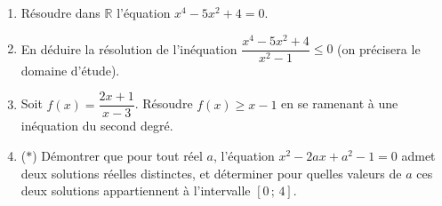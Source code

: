 \documentclass[11pt]{article}
\def\star{\mathbin{\ast}}\def\bigstar{\mathord{\ast}}%
\begin{document}
\begin{exercice}
\begin{enumerate}
\item Résoudre dans $\mathbb{R}$ l'équation $x^4 - 5x^2 + 4 = 0$.
\item En déduire la résolution de l'inéquation $\dfrac{x^4 - 5x^2 + 4}{x^2 - 1} \leq 0$ (on précisera le domaine d'étude).
\item Soit $f(x) = \dfrac{2x + 1}{x - 3}$. Résoudre $f(x) \geq x - 1$ en se ramenant à une inéquation du second degré.
\item ($\star$) Démontrer que pour tout réel $a$, l'équation $x^2 - 2ax + a^2 - 1 = 0$ admet deux solutions réelles distinctes, et déterminer pour quelles valeurs de $a$ ces deux solutions appartiennent à l'intervalle $[0\,;\,4]$.
\end{enumerate}
\end{exercice}
\end{document}
